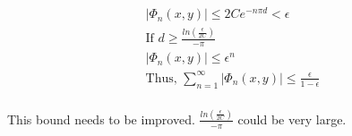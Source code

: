 \documentclass[12pt]{article}
\begin{document}
\begin{align*}
|\Phi_n(x, y)| \leq 2C e^{-n \pi d} < \epsilon\\
\text{If } d \geq \frac{ln(\frac{\epsilon}{2C})}{-\pi}\\
|\Phi_n(x, y)| \leq  \epsilon^{n}\\
\text{Thus, }\sum_{n=1}^{\infty} |\Phi_n(x, y)| \leq \frac{\epsilon}{1-\epsilon}\\
\end{align*}

This bound needs to be improved. $\frac{ln(\frac{\epsilon}{2C})}{-\pi}$ could be very large. 














    


\end{document}
